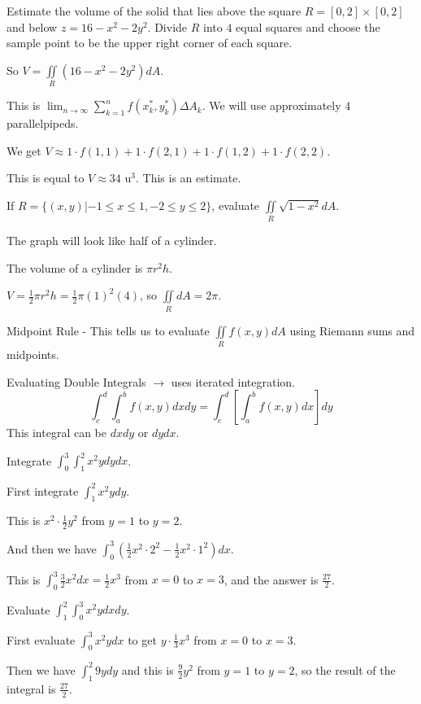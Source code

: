 \documentclass[../calc3.tex]{subfiles}
\begin{document}
\begin{example}
    Estimate the volume of the solid that lies above the square $R=[0,2]\times [0,2]$ and below $z=16-x^2-2y^2$. Divide $R$ into $4$ equal squares and choose the sample point to be the upper right corner of each square.

    So $V=\iint\limits_{R} (16-x^2-2y^2)dA$.

    This is $\lim_{n\to\infty}\sum_{k=1}^n f(x_k^*,y_k^*)\Delta A_k$. We will use approximately $4$ parallelpipeds.

    We get $V\approx 1\cdot f(1,1)+1\cdot f(2,1)+1\cdot f(1,2)+1\cdot f(2,2)$.

    This is equal to $V\approx 34$ u$^3$. This is an estimate.
\end{example}

\begin{example}
    If $R=\{ (x,y)|-1\leq x\leq 1, -2\leq y\leq 2\}$, evaluate $\iint\limits_{R} \sqrt{1-x^2}dA$.

    The graph will look like half of a cylinder.

    The volume of a cylinder is $\pi r^2 h$.

    $V=\frac{1}{2}\pi r^2 h=\frac{1}{2}\pi (1)^2(4)$, so $\iint\limits_{R} dA=2\pi$.
\end{example}

Midpoint Rule - This tells us to evaluate $\iint\limits_{R} f(x,y)dA$ using Riemann sums and midpoints.

Evaluating Double Integrals $\rightarrow$ uses iterated integration.
\[ \int_c^d \int_a^b f(x,y)dx dy = \int_c^d \left[ \int_a^b f(x,y)dx\right]dy \]
This integral can be $dxdy$ or $dydx$.

\begin{example}
    Integrate $\int_0^3 \int_1^2 x^2y dy dx$.

    First integrate $\int_1^2 x^2ydy$.

    This is $x^2\cdot \frac{1}{2}y^2$ from $y=1$ to $y=2$.

    And then we have $\int_0^3 \left(\frac{1}{2}x^2\cdot 2^2-\frac{1}{2}x^2\cdot 1^2\right)dx$.

    This is $\int_0^3 \frac{3}{2}x^2 dx = \frac{1}{2}x^3$ from $x=0$ to $x=3$, and the answer is $\frac{27}{2}$.
\end{example}

\begin{example}
    Evaluate $\int_1^2 \int_0^3 x^2 ydxdy$.

    First evaluate $\int_0^3 x^2y dx$ to get $y\cdot \frac{1}{3}x^3$ from $x=0$ to $x=3$.

    Then we have $\int_1^2 9y dy$ and this is $\frac{9}{2}y^2$ from $y=1$ to $y=2$, so the result of the integral is $\frac{27}{2}$.
\end{example}
\end{document}
